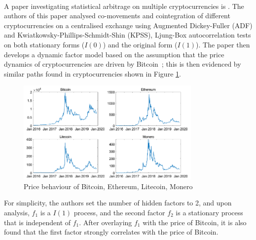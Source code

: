 \\[3mm]
A paper investigating statistical arbitrage on multiple cryptocurrencies is \cite{Figa-TalamancaGianna2021Cdff}. The authors of this paper analysed co-movements and cointegration of different cryptocurrencies on a centralised exchange using Augmented Dickey-Fuller (ADF) and  Kwiatkowsky-Phillips-Schmidt-Shin (KPSS), Ljung-Box autocorrelation tests on both stationary forms ($I(0)$) and the original form ($I(1)$). The paper then develops a dynamic factor model based on the assumption that the price dynamics of cryptocurrencies are driven by Bitcoin~\cite{blau2020comovement}; this is then evidenced by similar paths found in cryptocurrencies shown in Figure \ref{fig:pricebehaviour}.
\begin{figure}[h!]
    \centering
    \includegraphics[width=0.8\textwidth]{background/Images/price_behaviour.png}
    \caption{Price behaviour of Bitcoin, Ethereum, Litecoin, Monero~\cite{Figa-TalamancaGianna2021Cdff}}
    \label{fig:pricebehaviour}
\end{figure}

\noindent For simplicity, the authors set the number of hidden factors to 2, and upon analysis, $f_1$ is a $I(1)$ process, and the second factor $f_2$ is a stationary process that is independent of $f_1$. After overlaying $f_1$ with the price of Bitcoin, it is also found that the first factor strongly correlates with the price of Bitcoin.


